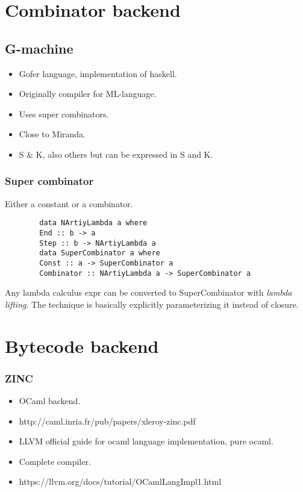 \documentclass[11pt]{article}
\begin{document}
    \section{Combinator backend}
    \subsection{G-machine}
    \begin{itemize}
        \item Gofer language, implementation of haskell.
        \item Originally compiler for ML-language.
        \item Uses super combinators.
        \item Close to Miranda.
        \item S \& K, also others but can be expressed in S and K.
    \end{itemize}
    \subsubsection{Super combinator}
    Either a constant or a combinator.
    \begin{verbatim}
        data NArtiyLambda a where
        End :: b -> a
        Step :: b -> NArtiyLambda a
        data SuperCombinator a where
        Const :: a -> SuperCombinator a
        Combinator :: NArtiyLambda a -> SuperCombinator a
    \end{verbatim}
    Any lambda calculus expr can be converted to SuperCombinator with \textit{lambda lifting}.
    The technique is basically explicitly parameterizing it instead of closure.

    \section{Bytecode backend}
    \subsubsection{ZINC}
    \begin{itemize}
        \item OCaml backend.
        \item http://caml.inria.fr/pub/papers/xleroy-zinc.pdf
    \end{itemize}
    \begin{itemize}
        \item LLVM official guide for ocaml language implementation, pure ocaml.
        \item Complete compiler.
        \item https://llvm.org/docs/tutorial/OCamlLangImpl1.html
    \end{itemize}
\end{document}
